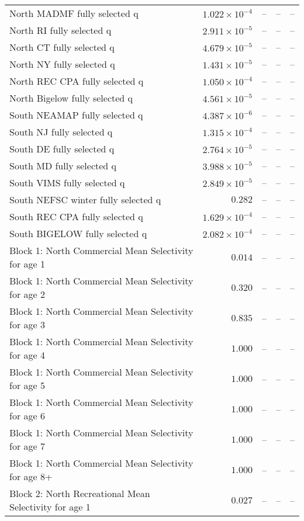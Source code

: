 \documentclass[
]{article}
\begin{document}
\begin{landscape}
\begin{longtable}[t]{lrrrr}
North MADMF fully selected q & $1.022\times 10^{-4}$ & -- & -- & --\\
North RI fully selected q & $2.911\times 10^{-5}$ & -- & -- & --\\
North CT fully selected q & $4.679\times 10^{-5}$ & -- & -- & --\\
\addlinespace
North NY fully selected q & $1.431\times 10^{-5}$ & -- & -- & --\\
North REC CPA fully selected q & $1.050\times 10^{-4}$ & -- & -- & --\\
North Bigelow fully selected q & $4.561\times 10^{-5}$ & -- & -- & --\\
South NEAMAP fully selected q & $4.387\times 10^{-6}$ & -- & -- & --\\
South NJ fully selected q & $1.315\times 10^{-4}$ & -- & -- & --\\
\addlinespace
South DE fully selected q & $2.764\times 10^{-5}$ & -- & -- & --\\
South MD fully selected q & $3.988\times 10^{-5}$ & -- & -- & --\\
South VIMS fully selected q & $2.849\times 10^{-5}$ & -- & -- & --\\
South NEFSC winter fully selected q & $0.282$ & -- & -- & --\\
South REC CPA fully selected q & $1.629\times 10^{-4}$ & -- & -- & --\\
\addlinespace
South BIGELOW fully selected q & $2.082\times 10^{-4}$ & -- & -- & --\\
Block 1: North Commercial Mean Selectivity for age 1 & $0.014$ & -- & -- & --\\
Block 1: North Commercial Mean Selectivity for age 2 & $0.320$ & -- & -- & --\\
Block 1: North Commercial Mean Selectivity for age 3 & $0.835$ & -- & -- & --\\
Block 1: North Commercial Mean Selectivity for age 4 & $1.000$ & -- & -- & --\\
\addlinespace
Block 1: North Commercial Mean Selectivity for age 5 & $1.000$ & -- & -- & --\\
Block 1: North Commercial Mean Selectivity for age 6 & $1.000$ & -- & -- & --\\
Block 1: North Commercial Mean Selectivity for age 7 & $1.000$ & -- & -- & --\\
Block 1: North Commercial Mean Selectivity for age 8+ & $1.000$ & -- & -- & --\\
Block 2: North Recreational Mean Selectivity for age 1 & $0.027$ & -- & -- & --\\

\end{longtable}
\end{landscape}
\end{document}
